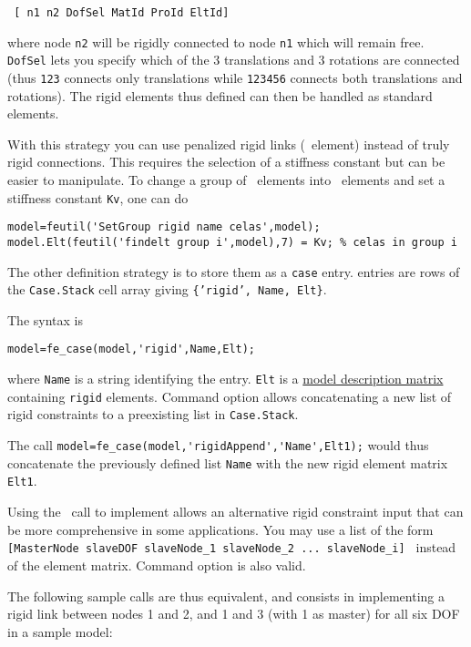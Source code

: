 \begin{verbatim}
 [ n1 n2 DofSel MatId ProId EltId]
\end{verbatim}

where node {\tt n2} will be rigidly connected to node {\tt n1} which will remain free. {\tt DofSel} lets you specify which of the 3 translations and 3 rotations are connected (thus {\tt 123} connects only translations while {\tt 123456} connects both translations and rotations). The rigid elements thus defined can then be handled as standard elements.


With this strategy you can use penalized rigid links (\celas\ element) instead of truly rigid connections. This requires the selection of a stiffness constant but can be easier to manipulate. To change a group of \rigid\ elements into \celas\ elements and set a stiffness constant {\tt Kv}, one can do

\begin{verbatim}
model=feutil('SetGroup rigid name celas',model);
model.Elt(feutil('findelt group i',model),7) = Kv; % celas in group i
\end{verbatim}


\vs The other  definition strategy is to store them as a {\tt case} entry.  entries are rows of the {\tt Case.Stack} cell array giving {\tt \{'rigid', Name, Elt\}}. 

The syntax is 
\begin{verbatim}
model=fe_case(model,'rigid',Name,Elt);
\end{verbatim}
where {\tt Name} is a string identifying the entry. {\tt Elt} is a \hyperlink{elt}{model description matrix} containing {\tt rigid} elements. 
Command option  allows concatenating a new list of rigid constraints to a preexisting list in {\tt Case.Stack}. 

The call \verb+model=fe_case(model,'rigidAppend','Name',Elt1);+ would thus concatenate the previously defined list {\tt Name} with the new rigid element matrix {\tt Elt1}.


Using the \fecase\ call to implement  allows an alternative rigid constraint input that can be more comprehensive in some applications. You may use a list of the form {\tt [MasterNode slaveDOF slaveNode\_1 slaveNode\_2 ... slaveNode\_i] } instead of the element matrix. Command option  is also valid.

\vs The following sample calls are thus equivalent, and consists in implementing a rigid link between nodes 1 and 2, and 1 and 3 (with 1 as master) for all six DOF in a sample model:

